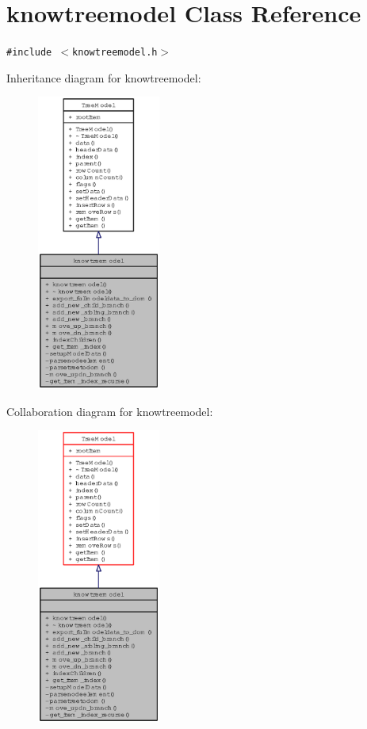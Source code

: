 \section{knowtreemodel Class Reference}
\label{classknowtreemodel}
{\tt \#include $<$knowtreemodel.h$>$}

Inheritance diagram for knowtreemodel:\begin{figure}[H]
\begin{center}
\leavevmode
\includegraphics[width=115pt]{classknowtreemodel__inherit__graph}
\end{center}
\end{figure}
Collaboration diagram for knowtreemodel:\begin{figure}[H]
\begin{center}
\leavevmode
\includegraphics[width=115pt]{classknowtreemodel__coll__graph}
\end{center}
\end{figure}
